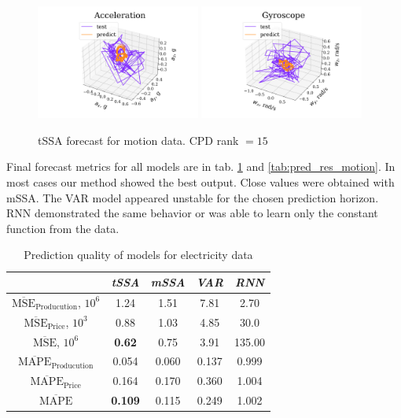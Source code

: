 \documentclass[referee, pdflatex]{sn-jnl}
\theoremstyle{definition}
\theoremstyle{plain}
\begin{document}
	\begin{figure}[h]
		\centering
		\includegraphics[width=0.48\textwidth, keepaspectratio]{../../experiments/motion/tssa/figs/prediction/cpd_rank_15/acceler.png}
		\includegraphics[width=0.48\textwidth, keepaspectratio]{../../experiments/motion/tssa/figs/prediction/cpd_rank_15/gyro.png}
		\caption{tSSA forecast for motion data. CPD rank $ = 15 $}\label{fig:tssa_weather_pred}
	\end{figure}
	
	Final forecast metrics for all models are in tab. \ref{tab:pred_res_electr} and \ref{tab:pred_res_motion}. In most cases our method showed the best output. Close values were obtained with mSSA. The VAR model appeared unstable for the chosen prediction horizon. RNN demonstrated the same behavior or was able to learn only the constant function from the data.
	
	\def\arraystretch{1.1}
	\begin{table}[h]
		\centering
		\caption{Prediction quality of models for electricity data}\label{tab:pred_res_electr}
		\begin{tabular}{|c|c|c|c|c|}
			\hline
			& \textit{tSSA}  & \textit{mSSA} & \textit{VAR} & \textit{RNN} \\ \hline
			$ \overline{\text{MSE}}_{\text{Producution}} $, $10^6$ & 1.24           & 1.51          & 7.81         & 2.70         \\ \hline
			$ \overline{\text{MSE}}_{\text{Price}} $, $10^3$      & 0.88           & 1.03          & 4.85         & 30.0         \\ \hline
			$ \overline{\text{MSE}} $, $10^6$             & \textbf{0.62}  & 0.75          & 3.91         & 135.00       \\ \hline
			$ \overline{\text{MAPE}}_{\text{Producution}} $        & 0.054          & 0.060         & 0.137        & 0.999        \\ \hline
			$ \overline{\text{MAPE}}_{\text{Price}} $             & 0.164          & 0.170         & 0.360        & 1.004        \\ \hline
			$ \overline{\text{MAPE}} $                    & \textbf{0.109} & 0.115         & 0.249        & 1.002        \\ \hline
		\end{tabular}
	\end{table}
	
\end{document}
